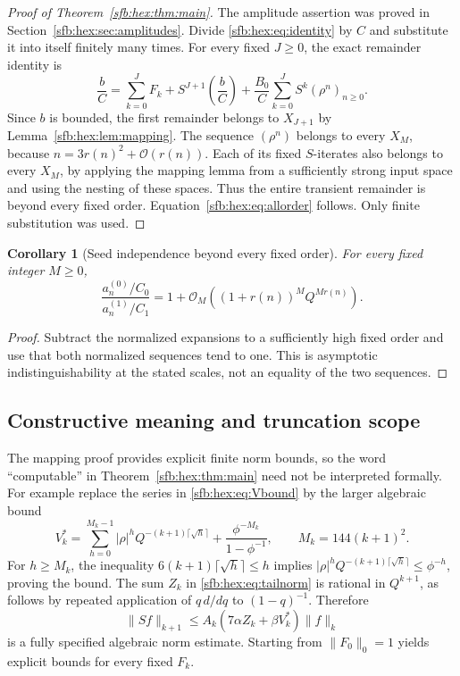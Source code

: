 \documentclass[11pt]{article}
\newtheorem{corollary}[theorem]{Corollary}
\theoremstyle{remark}\newtheorem{remark}[theorem]{Remark}
\newcommand{\OO}{\mathcal O}
\begin{document}
\begin{proof}[Proof of Theorem~\ref{sfb:hex:thm:main}]
The amplitude assertion was proved in Section~\ref{sfb:hex:sec:amplitudes}. Divide \eqref{sfb:hex:eq:identity} by $C$ and substitute it into itself finitely many times. For every fixed $J\ge0$, the exact remainder identity is
\begin{equation}\label{sfb:hex:eq:finiteiteration}
 \frac bC=\sum_{k=0}^JF_k+S^{J+1}\!\left(\frac bC\right)
   +\frac{B_0}{C}\sum_{k=0}^JS^k(\rho^n)_{n\ge0}.
\end{equation}
Since $b$ is bounded, the first remainder belongs to $X_{J+1}$ by Lemma~\ref{sfb:hex:lem:mapping}. The sequence $(\rho^n)$ belongs to every $X_M$, because $n=3r(n)^2+\OO(r(n))$. Each of its fixed $S$-iterates also belongs to every $X_M$, by applying the mapping lemma from a sufficiently strong input space and using the nesting of these spaces. Thus the entire transient remainder is beyond every fixed order. Equation~\eqref{sfb:hex:eq:allorder} follows. Only finite substitution was used.
\end{proof}

\begin{corollary}[Seed independence beyond every fixed order]\label{sfb:hex:cor:seed}
For every fixed integer $M\ge0$,
\begin{equation}\label{sfb:hex:eq:seedindependence}
 \frac{a^{(0)}_n/C_0}{a^{(1)}_n/C_1}
 =1+\OO_M\!\left((1+r(n))^M Q^{Mr(n)}\right).
\end{equation}
\end{corollary}
\begin{proof}
Subtract the normalized expansions to a sufficiently high fixed order and use that both normalized sequences tend to one. This is asymptotic indistinguishability at the stated scales, not an equality of the two sequences.
\end{proof}

\subsection{Constructive meaning and truncation scope}\label{sfb:hex:sec:computability}
The mapping proof provides explicit finite norm bounds, so the word ``computable'' in Theorem~\ref{sfb:hex:thm:main} need not be interpreted formally. For example replace the series in \eqref{sfb:hex:eq:Vbound} by the larger algebraic bound
\begin{equation}\label{sfb:hex:eq:Vexplicit}
 V_k^*=\sum_{h=0}^{M_k-1}|\rho|^hQ^{-(k+1)\lceil\sqrt h\rceil}
          +\frac{\phi^{-M_k}}{1-\phi^{-1}},
 \qquad M_k=144(k+1)^2.
\end{equation}
For $h\ge M_k$, the inequality $6(k+1)\lceil\sqrt h\rceil\le h$ implies
$|\rho|^hQ^{-(k+1)\lceil\sqrt h\rceil}\le\phi^{-h}$, proving the bound. The sum $Z_k$ in \eqref{sfb:hex:eq:tailnorm} is rational in $Q^{k+1}$, as follows by repeated application of $q\,d/dq$ to $(1-q)^{-1}$. Therefore
\begin{equation}\label{sfb:hex:eq:opnorm}
 \|Sf\|_{k+1}\le A_k(7\alpha Z_k+\beta V_k^*)\|f\|_k
\end{equation}
is a fully specified algebraic norm estimate. Starting from $\|F_0\|_0=1$ yields explicit bounds for every fixed $F_k$.
\end{document}

